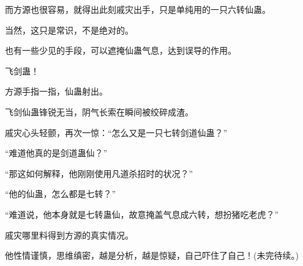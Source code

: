 \begin{this_body}
而方源也很容易，就得出此刻戚灾出手，只是单纯用的一只六转仙蛊。

当然，这只是常识，不是绝对的。

也有一些少见的手段，可以遮掩仙蛊气息，达到误导的作用。

飞剑蛊！

方源手指一指，仙蛊射出。

飞剑仙蛊锋锐无当，阴气长索在瞬间被绞碎成渣。

戚灾心头轻颤，再次一惊：“怎么又是一只七转剑道仙蛊？”

“难道他真的是剑道蛊仙？”

“那这如何解释，他刚刚使用凡道杀招时的状况？”

“他的仙蛊，怎么都是七转？”

“难道说，他本身就是七转蛊仙，故意掩盖气息成六转，想扮猪吃老虎？”

戚灾哪里料得到方源的真实情况。

他性情谨慎，思维缜密，越是分析，越是惊疑，自己吓住了自己！(未完待续。)

\end{this_body}

